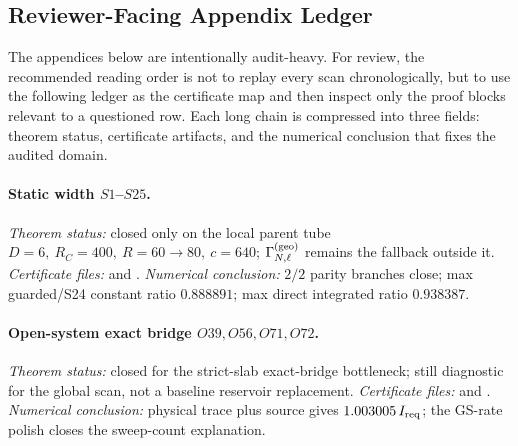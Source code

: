 \documentclass[aps,prd,onecolumn,notitlepage,nofootinbib,superscriptaddress,11pt,floatfix]{revtex4-2}
\begin{document}
\subsection{Reviewer-Facing Appendix Ledger}
\label{app:reviewer_ledger}
The appendices below are intentionally audit-heavy.  For review, the recommended reading order is not to replay every scan chronologically, but to use the following ledger as the certificate map and then inspect only the proof blocks relevant to a questioned row.  Each long chain is compressed into three fields: theorem status, certificate artifacts, and the numerical conclusion that fixes the audited domain.

\paragraph{Static width \(S1\)--\(S25\).}
\emph{Theorem status:} closed only on the local parent tube \(D=6,\ R_C=400,\ R=60\to80,\ c=640\); \(\Gamma_{N,\ell}^{(\rm geo)}\) remains the fallback outside it.
\emph{Certificate files:}  and .
\emph{Numerical conclusion:} \(2/2\) parity branches close; max guarded/S24 constant ratio \(0.888891\); max direct integrated ratio \(0.938387\).

\paragraph{Open-system exact bridge \(O39,O56,O71,O72\).}
\emph{Theorem status:} closed for the strict-slab exact-bridge bottleneck; still diagnostic for the global scan, not a baseline reservoir replacement.
\emph{Certificate files:}  and .
\emph{Numerical conclusion:} physical trace plus source gives \(1.003005\,I_{\rm req}\); the GS-rate polish closes the sweep-count explanation.
\end{document}
